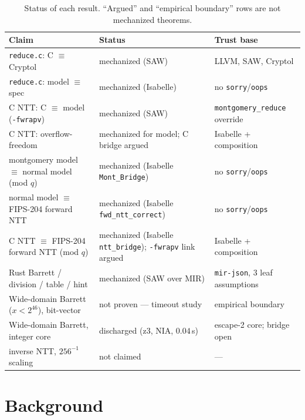 \documentclass[journal=tches,submission,review]{iacrtrans}
\newcommand{\code}[1]{\texttt{#1}}
\begin{document}
\begin{table}[h]
\centering\footnotesize
\begin{tabularx}{\textwidth}{@{}X X X@{}}
\hline
Claim & Status & Trust base \\
\hline
\code{reduce.c}: C $\equiv$ Cryptol & mechanized (SAW) & LLVM, SAW, Cryptol \\
\code{reduce.c}: model $\equiv$ spec & mechanized (Isabelle) & no \code{sorry}/\code{oops} \\
C NTT: C $\equiv$ model (\code{-fwrapv}) & mechanized (SAW) & \code{montgomery\_reduce} override \\
C NTT: overflow-freedom & mechanized for model; C bridge argued & Isabelle + composition \\
montgomery model $\equiv$ normal model (mod $q$) & mechanized (Isabelle \code{Mont\_Bridge}) & no \code{sorry}/\code{oops} \\
normal model $\equiv$ FIPS-204 forward NTT & mechanized (Isabelle \code{fwd\_ntt\_correct}) & no \code{sorry}/\code{oops} \\
C NTT $\equiv$ FIPS-204 forward NTT (mod $q$) & mechanized (Isabelle \code{ntt\_bridge}); \code{-fwrapv} link argued & Isabelle + composition \\
Rust Barrett / division / table / hint & mechanized (SAW over MIR) & \code{mir-json}, 3 leaf assumptions \\
Wide-domain Barrett ($x<2^{46}$), bit-vector & not proven --- timeout study & empirical boundary \\
Wide-domain Barrett, integer core & discharged (z3, NIA, $0.04$\,s) & escape-2 core; bridge open \\
inverse NTT, $256^{-1}$ scaling & not claimed & --- \\
\hline
\end{tabularx}
\caption{Status of each result. ``Argued'' and ``empirical boundary'' rows are not mechanized theorems.}
\label{tab:status}
\end{table}

\section{Background}\label{sec:background}
\end{document}

